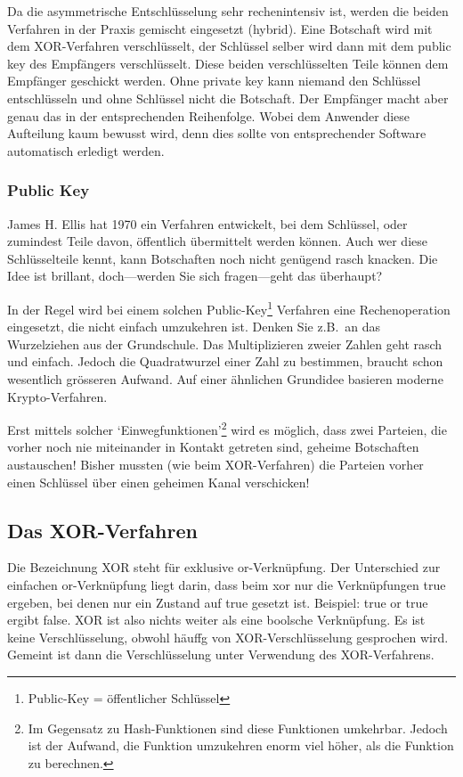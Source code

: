 Da die asymmetrische Entschlüsselung sehr rechenintensiv ist, werden die
beiden Verfahren in der Praxis gemischt eingesetzt (hybrid). Eine Botschaft
wird mit dem XOR-Verfahren verschlüsselt, der Schlüssel selber wird dann
mit dem public key des Empfängers verschlüsselt. Diese beiden verschlüsselten
Teile können dem Empfänger geschickt werden. Ohne private key kann niemand
den Schlüssel entschlüsseln und ohne Schlüssel nicht die Botschaft. Der
Empfänger macht aber genau das in der entsprechenden Reihenfolge.
Wobei dem Anwender diese Aufteilung kaum bewusst wird, denn dies
sollte von entsprechender Software automatisch erledigt werden.

\subsubsection*{Public Key}

James H. Ellis hat 1970 ein Verfahren entwickelt, bei dem Schlüssel, oder
zumindest Teile davon, öffentlich übermittelt werden können. Auch wer
diese Schlüsselteile kennt, kann Botschaften noch nicht genügend rasch
knacken. Die Idee ist brillant, doch---werden Sie sich fragen---geht
das überhaupt?

In der Regel wird bei einem solchen Public-Key\footnote{Public-Key = öffentlicher Schlüssel}
Verfahren eine Rechenoperation eingesetzt, die nicht einfach umzukehren ist.
Denken Sie z.B.~an das Wurzelziehen aus der Grundschule. Das Multiplizieren
zweier Zahlen geht rasch und einfach. Jedoch die Quadratwurzel einer Zahl
zu bestimmen, braucht schon wesentlich grösseren Aufwand. Auf einer
ähnlichen Grundidee basieren moderne Krypto-Verfahren.

Erst mittels solcher `Einwegfunktionen'\footnote{Im Gegensatz zu
Hash-Funktionen  sind diese Funktionen umkehrbar.
Jedoch ist der Aufwand, die Funktion umzukehren enorm viel höher,
als die Funktion zu berechnen.} wird es möglich, dass zwei Parteien,
die vorher noch nie miteinander in Kontakt getreten sind, geheime
Botschaften austauschen! Bisher mussten (wie beim XOR-Verfahren)
die Parteien vorher einen Schlüssel über einen geheimen Kanal verschicken!

\subsection{Das XOR-Verfahren}
\label{subsec:xor}

Die Bezeichnung XOR steht für exklusive or-Verknüpfung. Der Unterschied
zur einfachen or-Verknüpfung liegt darin, dass beim xor nur die
Verknüpfungen true ergeben, bei denen nur ein Zustand auf true
gesetzt ist. Beispiel: true or true ergibt false. XOR ist also
nichts weiter als eine boolsche Verknüpfung. Es ist keine
Verschlüsselung, obwohl häuffg von XOR-Verschlüsselung gesprochen
wird. Gemeint ist dann die Verschlüsselung unter Verwendung des
XOR-Verfahrens.


